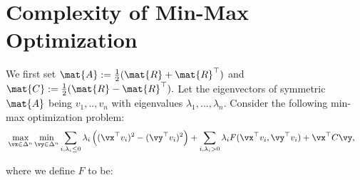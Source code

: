 \section{Complexity of Min-Max Optimization}
\label{sec:main}
We first set $\mat{A} := \frac{1}{2}(\mat{R}+\mat{R}^{\top})$ and $\mat{C} := \frac{1}{2}(\mat{R}-\mat{R}^{\top}).$ Let the eigenvectors of symmetric $\mat{A}$ being $v_1,..,v_n$ with eigenvalues $\lambda_{1},...,\lambda_n.$ Consider the following min-max optimization problem:
\begin{align}
    & \max_{\vx \in \Delta^n} \min_{\vy \in\Delta^n} 
    \sum_{i, \lambda_i\leq 0} \lambda_{i} \left((\vx^{\top}v_i)^2- (\vy^{\top}v_i)^2\right) +\sum_{i,\lambda_i>0}\lambda_i F(\vx^{\top}v_i,\vy^{\top}v_i)+\vx^{\top}C\vy  \label{eq:main_problem},
\end{align}

where we define $F$ to be:

